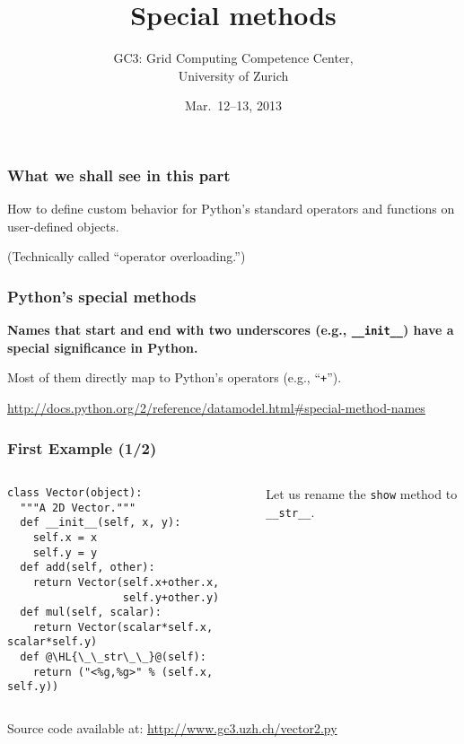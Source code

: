 \documentclass[english,serif,mathserif,xcolor=pdftex,dvipsnames,table]{beamer}
\title[Special methods]{%
  Special methods
}
\author[GC3]{%
  GC3: Grid Computing Competence Center, \\
  University of Zurich
}
\date{Mar.~12--13, 2013}
\begin{document}
\maketitle


\begin{frame}
  \frametitle{What we shall see in this part}

  How to define custom behavior for Python's standard operators and
  functions on user-defined objects.

  \+
  (Technically called ``operator overloading.'')
\end{frame}


\begin{frame}[fragile]
  \frametitle{Python's special methods}

  \textbf{Names that start and end with two underscores (e.g.,
    \lstinline|__init__|) have a special significance in Python.}

  \+ Most of them directly map to Python's operators (e.g.,
  ``\texttt{+}'').

  \+
  \begin{references}
    \url{http://docs.python.org/2/reference/datamodel.html#special-method-names}
  \end{references}
\end{frame}


\begin{frame}[fragile]
  \frametitle{First Example (1/2)}
  \begin{columns}[t]
    \begin{column}{0.5\textwidth}
\begin{lstlisting}
class Vector(object):
  """A 2D Vector."""
  def __init__(self, x, y):
    self.x = x
    self.y = y
  def add(self, other):
    return Vector(self.x+other.x,
                  self.y+other.y)
  def mul(self, scalar):
    return Vector(scalar*self.x, scalar*self.y)
  def @\HL{\_\_str\_\_}@(self):
    return ("<%g,%g>" % (self.x, self.y))
\end{lstlisting}
    \end{column}
    \begin{column}{0.5\textwidth}
      \raggedleft
      Let us rename the \texttt{show} method to \texttt{\_\_str\_\_}.
    \end{column}
  \end{columns}

  \+
  {\scriptsize Source code available at:
    \url{http://www.gc3.uzh.ch/vector2.py}}
\end{frame}
\end{document}
